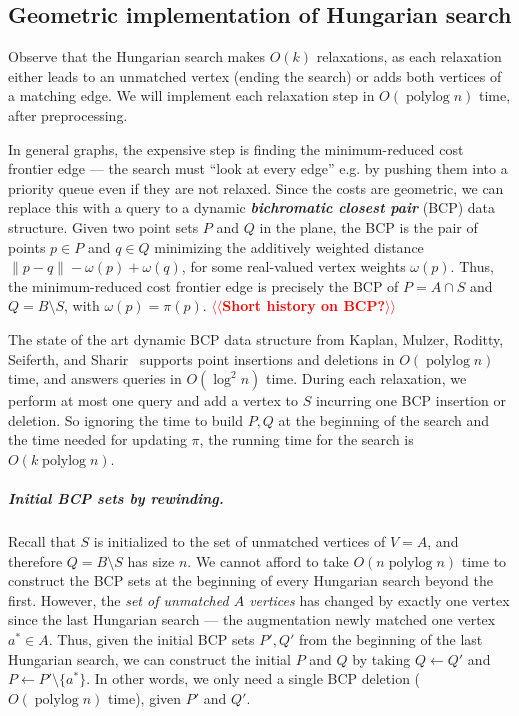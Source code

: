 \documentclass[a4paper,UKenglish]{socg-lipics-v2018}
\makeatletter
\def\note#1{\textcolor{red}{{#1}}}
\def\polylog{\mathop{\mathrm{polylog}}}
\theoremstyle{plain}
\numberwithin{figure}{section}
\renewcommand{\paragraph}{\subparagraph}
\def\EMPH#1{\textbf{\emph{\boldmath #1}}}
\def\n@te#1{\textsf{\boldmath \textbf{$\langle\!\langle$#1$\rangle\!\rangle$}}\leavevmode}
\def\note#1{\textcolor{red}{\n@te{#1}}}
\makeatother
\begin{document}
\subsection{Geometric implementation of Hungarian search}

Observe that the Hungarian search makes $O(k)$ relaxations, as each
relaxation either leads to an unmatched vertex (ending the search) or 
adds both vertices of a matching edge.
We will implement each relaxation step in $O(\polylog n)$ time, after
preprocessing.

In general graphs, the expensive step is finding the minimum-reduced cost
frontier edge --- the search must ``look at every edge'' e.g. by pushing them
into a priority queue even if they are not relaxed.
Since the costs are geometric, we can replace this with a query to a dynamic
\EMPH{bichromatic closest pair} (BCP) data structure.
Given two point sets $P$ and $Q$ in the plane, the BCP is the pair of points
$p \in P$ and $q \in Q$ minimizing the additively weighted distance
$\|p - q\| - \omega(p) + \omega(q)$, for some real-valued vertex weights
$\omega(p)$.
Thus, the minimum-reduced cost frontier edge is precisely the BCP of
$P = A \cap S$ and $Q = B \setminus S$, with $\omega(p) = \pi(p)$.
\note{Short history on BCP?}

The state of the art dynamic BCP data structure from Kaplan, Mulzer, Roditty,
Seiferth, and Sharir~\cite{KMRSS17} supports point insertions and deletions in
$O(\polylog n)$ time, and answers queries in $O(\log^2 n)$ time.
During each relaxation, we perform at most one query and add a vertex to $S$
incurring one BCP insertion or deletion.
So ignoring the time to build $P, Q$ at the beginning of the search and the
time needed for updating $\pi$, the running time for the search is $O(k\polylog n)$.

\paragraph{Initial BCP sets by rewinding.}
Recall that $S$ is initialized to the set of unmatched vertices of $V = A$,
and therefore $Q = B \setminus S$ has size $n$.
We cannot afford to take $O(n\polylog n)$ time to construct the BCP sets at the
beginning of every Hungarian search beyond the first.
However, the \emph{set of unmatched $A$ vertices} has changed by exactly one
vertex since the last Hungarian search --- the augmentation newly matched one
vertex $a^* \in A$.
Thus, given the initial BCP sets $P', Q'$ from the beginning of the last
Hungarian search, we can construct the initial $P$ and $Q$ by taking
$Q \gets Q'$ and $P \gets P' \setminus \{a^*\}$.
In other words, we only need a single BCP deletion ($O(\polylog n)$ time),
given $P'$ and $Q'$.
\end{document}
